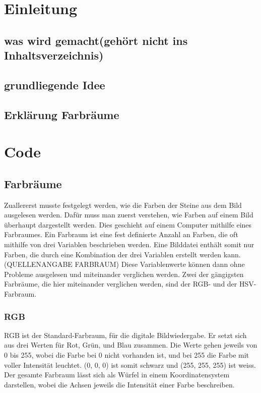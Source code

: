 \documentclass[a4paper, 12pt]{article}
\begin{document}
\tableofcontents
\section{Einleitung}
\subsection{was wird gemacht(gehört nicht ins Inhaltsverzeichnis)}
\subsection{grundliegende Idee}
\subsection{Erklärung Farbräume}
\section{Code}
\subsection{Farbräume}
Zuallererst musste festgelegt werden, wie die Farben der Steine aus dem Bild ausgelesen werden. Dafür muss man zuerst verstehen, wie Farben auf einem Bild überhaupt dargestellt werden. Dies geschieht auf einem Computer mithilfe eines Farbraumes. Ein Farbraum ist eine fest definierte Anzahl an Farben, die oft mithilfe von drei Variablen beschrieben werden. Eine Bilddatei enthält somit nur Farben, die durch eine Kombination der drei Variablen erstellt werden kann.(QUELLENANGABE FARBRAUM) Diese Variablenwerte können dann ohne Probleme ausgelesen und miteinander verglichen werden. Zwei der gängigsten Farbräume, die hier miteinander verglichen werden, sind der RGB- und der HSV-Farbraum. 
\subsubsection{RGB}
RGB ist der Standard-Farbraum, für die digitale Bildwiedergabe. Er setzt sich aus drei Werten für Rot, Grün, und Blau zusammen. Die Werte gehen jeweils von 0 bis 255, wobei die Farbe bei 0 nicht vorhanden ist, und bei 255 die Farbe mit voller Intensität leuchtet. (0, 0, 0) ist somit schwarz und (255, 255, 255) ist weiss. Der gesamte Farbraum lässt sich als Würfel in einem Koordinatensystem darstellen, wobei die Achsen jeweils die Intensität einer Farbe beschreiben.
\end{document}
